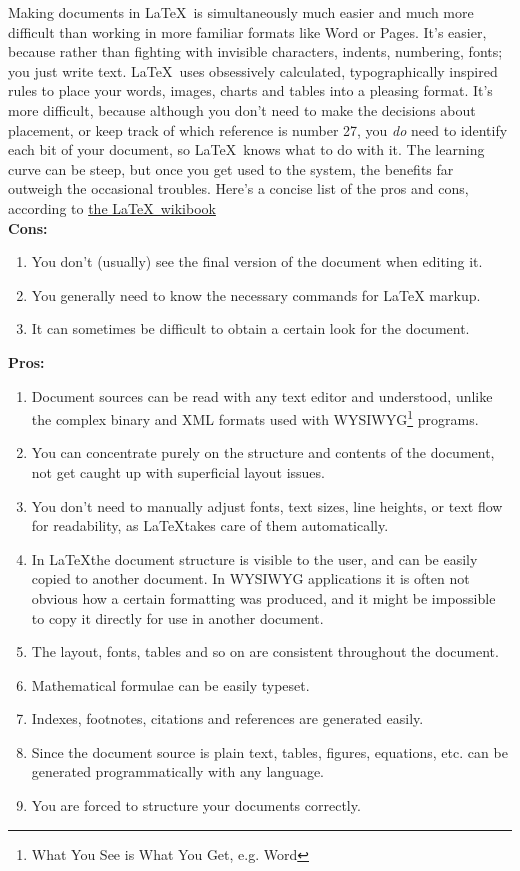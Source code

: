 \documentclass[12pt]{article}
\begin{document}
Making documents in \LaTeX ~is simultaneously much easier and much more difficult than working in more familiar formats like Word or Pages. It's easier, because rather than fighting with invisible characters, indents, numbering, fonts; you just write text. \LaTeX ~uses obsessively calculated, typographically inspired rules to place your words, images, charts and tables into a pleasing format. 
It's more difficult, because although you don't need to make the decisions about placement, or keep track of which reference is number 27, you \emph{do} need to identify each bit of your document, so \LaTeX ~knows what to do with it. The learning curve can be steep, but once you get used to the system, the benefits far outweigh the occasional troubles. Here's a concise list of the pros and cons, according to \href{https://en.wikibooks.org/wiki/LaTeX}{the \LaTeX ~wikibook}\cite{Wikibooks:2014un}\\
\textbf{Cons:}
\begin{enumerate}
\item You don't (usually) see the final version of the document when editing it.
\item You generally need to know the necessary commands for LaTeX markup.
\item It can sometimes be difficult to obtain a certain look for the document.
\end{enumerate}
\textbf{Pros:}
\begin{enumerate}
\item Document sources can be read with any text editor and understood, unlike the complex binary and XML formats used with WYSIWYG\footnote{What You See is What You Get, e.g. Word} programs.
\item You can concentrate purely on the structure and contents of the document, not get caught up with superficial layout issues.
\item You don't need to manually adjust fonts, text sizes, line heights, or text flow for readability, as \LaTeX takes care of them automatically.
\item In \LaTeX the document structure is visible to the user, and can be easily copied to another document. In WYSIWYG applications it is often not obvious how a certain formatting was produced, and it might be impossible to copy it directly for use in another document.
\item The layout, fonts, tables and so on are consistent throughout the document.
\item Mathematical formulae can be easily typeset.
\item Indexes, footnotes, citations and references are generated easily.
\item Since the document source is plain text, tables, figures, equations, etc. can be generated programmatically with any language.
\item You are forced to structure your documents correctly.
\end{enumerate}
\end{document}
